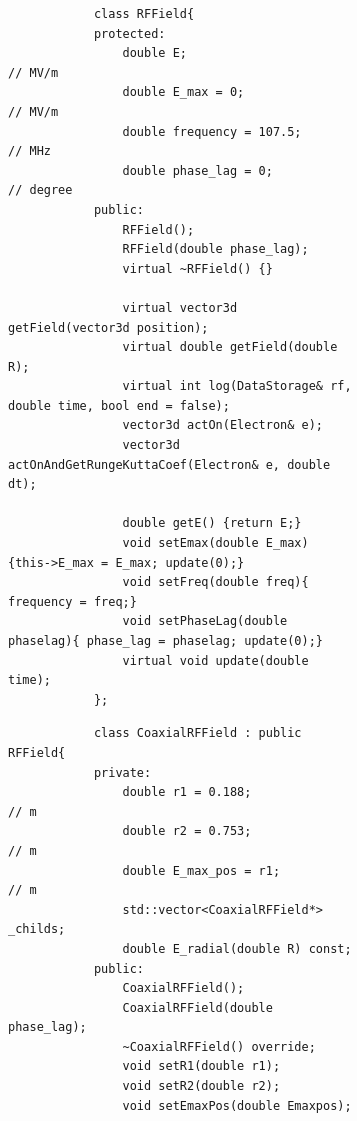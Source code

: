 \documentclass[a4paper,oneside,12pt]{report}
\numberwithin{equation}{chapter}
\begin{document}
\begin{figure}[H]
    \captionsetup[subfigure]{justification=centering}
    \captionsetup{justification=centering}
    \begin{subfigure}{\textwidth}
        \begin{verbatim}
            class RFField{
            protected:
                double E;                       // MV/m
                double E_max = 0;               // MV/m
                double frequency = 107.5;       // MHz
                double phase_lag = 0;           // degree
            public:
                RFField();
                RFField(double phase_lag);
                virtual ~RFField() {}

                virtual vector3d getField(vector3d position);              
                virtual double getField(double R);
                virtual int log(DataStorage& rf, double time, bool end = false);
                vector3d actOn(Electron& e);    
                vector3d actOnAndGetRungeKuttaCoef(Electron& e, double dt);                  
                
                double getE() {return E;}
                void setEmax(double E_max) {this->E_max = E_max; update(0);}
                void setFreq(double freq){ frequency = freq;}
                void setPhaseLag(double phaselag){ phase_lag = phaselag; update(0);}
                virtual void update(double time);
            };
        \end{verbatim}
    \end{subfigure}

    \begin{subfigure}{\textwidth}
        \begin{verbatim}
            class CoaxialRFField : public RFField{
            private:
                double r1 = 0.188;                         // m
                double r2 = 0.753;                         // m
                double E_max_pos = r1;                     // m
                std::vector<CoaxialRFField*> _childs;
                double E_radial(double R) const;
            public:
                CoaxialRFField();
                CoaxialRFField(double phase_lag);
                ~CoaxialRFField() override;
                void setR1(double r1);
                void setR2(double r2);
                void setEmaxPos(double Emaxpos);   


\end{verbatim}
\end{subfigure}
\end{figure}
\end{document}
